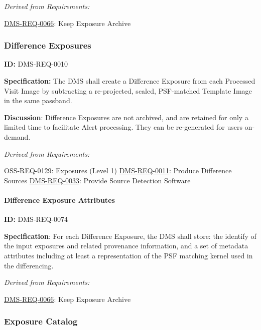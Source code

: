 \documentclass[SE,toc,lsstdraft]{lsstdoc}
\begin{document}
\emph{Derived from Requirements:}

\hyperref[DMS-REQ-0066]{DMS-REQ-0066}:
Keep Exposure Archive \newline


\subsubsection{Difference Exposures}

\label{DMS-REQ-0010}
\textbf{ID:} DMS-REQ-0010

\textbf{Specification:} The DMS shall create a Difference Exposure from each Processed Visit Image by subtracting a re-projected, scaled, PSF-matched Template Image in the same passband.

\textbf{Discussion}: Difference Exposures are not archived, and are retained for only a limited time to facilitate Alert processing. They can be re-generated for users on-demand.




\emph{Derived from Requirements:}

OSS-REQ-0129:
Exposures (Level 1) \newline
\hyperref[DMS-REQ-0011]{DMS-REQ-0011}:
Produce Difference Sources \newline
\hyperref[DMS-REQ-0033]{DMS-REQ-0033}:
Provide Source Detection Software \newline


\paragraph{Difference Exposure Attributes}\hfill  %

\label{DMS-REQ-0074}
\textbf{ID:} DMS-REQ-0074

\textbf{Specification}: For each Difference Exposure, the DMS shall store: the identify of the input exposures and related provenance information, and a set of metadata attributes including at least a representation of the PSF matching kernel used in the differencing.






\emph{Derived from Requirements:}

\hyperref[DMS-REQ-0066]{DMS-REQ-0066}:
Keep Exposure Archive \newline


\subsubsection{Exposure Catalog}
\end{document}
